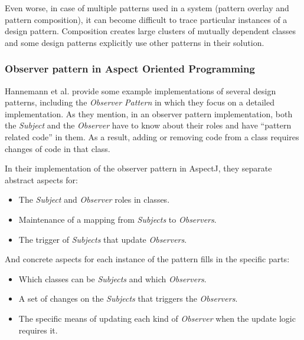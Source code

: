 Even worse, in case of multiple patterns used in a system (pattern overlay and pattern composition), it can become difficult to trace particular instances of a design pattern. 
Composition creates large clusters of mutually dependent classes\cite{sullivan2002advanced} and some design patterns explicitly use other patterns in their solution.

\subsubsection{Observer pattern in Aspect Oriented Programming}\label{Observer pattern in Aspect Oriented Programming}
Hannemann et al. \cite{hannemann2002design} provide some example implementations of several design patterns, including the \textit{Observer Pattern} in which they focus on a detailed implementation.
As they mention, in an observer pattern implementation, both the \textit{Subject} and the \textit{Observer} have to know about their roles and have ``pattern related code'' in them. 
As a result, adding or removing code from a class requires changes of code in that class. 

In their implementation \cite{hannemann2002design} of the observer pattern in AspectJ, they separate abstract aspects for: 

\begin{itemize}
	\item The \textit{Subject} and \textit{Observer} roles in classes.

	\item Maintenance of a mapping from \textit{Subjects} to \textit{Observers}.

	\item The trigger of \textit{Subjects} that update \textit{Observers}.
\end{itemize}

And concrete aspects for each instance of the pattern fills in the specific parts:
\begin{itemize}
	\item Which classes can be \textit{Subjects} and which \textit{Observers}.

	\item A set of changes on the \textit{Subjects} that triggers the \textit{Observers}.

	\item The specific means of updating each kind of \textit{Observer} when the update logic requires it.
\end{itemize}

